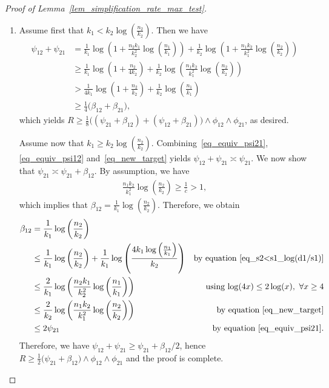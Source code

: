 \documentclass{article}
\begin{document}
\begin{proof}[Proof of Lemma~\ref{lem_simplification_rate_max_test}]
\begin{enumerate}
provided $a_1$ and $a_2$ are larger than suitably large constants, which can be enforced by choosing $c'$ small enough. 
This concludes the proof of the first claim.
\item Assume first that $k_1 < k_2 \log \left(\frac{n_2}{k_2}\right)$. 
Then we have 
    $$\begin{aligned}
    \psi_{12} + \psi_{21}
    & = \frac{1}{k_1} \log\left(1+ \frac{n_2k_1}{k_2^2} \log\left(\frac{n_1}{k_1}\right)\right) + \frac{1}{k_2} \log\left(1+ \frac{n_1k_2}{k_1^2} \log\left(\frac{n_2}{k_2}\right)\right)\\
    & \geq \frac{1}{k_1} \log\left( 1+ \frac{n_2}{4k_2} \right) + \frac{1}{k_2} \log\left(  \frac{n_1k_2}{k_1^2} \log\left(\frac{n_2}{k_2}\right)\right)\\
    & > \frac{1}{4k_1} \log\left( 1+ \frac{n_2}{k_2} \right) + \frac{1}{k_2} \log\left(\frac{n_1}{k_1}\right)\\
    & \geq \frac{1}{4} \big(\beta_{12} + \beta_{21}\big),
\end{aligned}
$$
which yields $R \geq \frac{1}{8} \big((\psi_{21} + \beta_{12}) + (\psi_{12}+\beta_{21})\big) \land \phi_{12} \land \phi_{21}$, as desired. 

Assume now that $k_1 \geq k_2 \log \left(\frac{n_2}{k_2}\right)$. 
Combining~\eqref{eq_equiv_psi21}, \eqref{eq_equiv_psi12} and~\eqref{eq_new_target} yields $\psi_{12} + \psi_{21} \asymp \psi_{21}$. 
We now show that $\psi_{21} \asymp \psi_{21} + \beta_{12}$. 
By assumption, we have
\begin{align*}
    \frac{n_1k_2}{k_1^2} \log\left(\frac{n_2}{k_2}\right)\geq \frac{1}{\bar c} >1,
\end{align*}
which implies that $\beta_{12} = \frac{1}{k_1} \log\left(\frac{n_2}{k_2}\right)$. 
Therefore, we obtain
\begin{align*}
        \beta_{12} & =\frac{1}{k_1} \log\left( \frac{n_2}{k_2} \right) & \\
        & \leq \frac{1}{k_1} \log\left( \frac{n_2}{k_2} \right) + \frac{1}{k_1} \log\left(\frac{4k_1\log\left(\frac{n_1}{k_1}\right)}{k_2}\right) & \text{by equation~\eqref{eq_s2<s1_log(d1/s1)}}\\
        &\leq \frac{2}{k_1} \log\left( \frac{n_2k_1}{k_2^2} \log\left(\frac{n_1}{k_1}\right)\right) & \text{ using $\log(4x) \leq 2 \log(x), ~\forall x\geq 4$}\\
        &\leq \frac{2}{k_2} \log\left( \frac{n_1k_2}{k_1^2} \log\left(\frac{n_2}{k_2}\right)\right) & \text{by equation~\eqref{eq_new_target}}\\
        & \leq 2 \psi_{21} & \text{ by equation~\eqref{eq_equiv_psi21}.}
    \end{align*}
    Therefore, we have $\psi_{12} + \psi_{21} \geq \psi_{21} + \beta_{12}/2$, hence $R \geq \frac{1}{2}\big(\psi_{21} + \beta_{12} \big) \land \phi_{12} \land \phi_{21}$ and the proof is complete.

    
    
\end{enumerate}
\end{proof}
\end{document}
